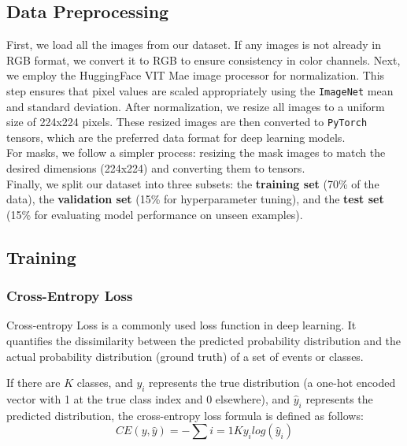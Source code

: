 \subsection{Data Preprocessing}
First, we load all the images from our dataset. If any images is not already in RGB format, we convert it to RGB to ensure consistency in color channels. Next, we employ the HuggingFace VIT Mae image processor %
for normalization. This step ensures that pixel values are scaled appropriately using the \texttt{ImageNet} mean and standard deviation. After normalization, we resize all images to a uniform size of 224x224 pixels. These resized images are then converted to \texttt{PyTorch} tensors, which are the preferred data format for deep learning models. \\For masks, we follow a simpler process: resizing the mask images to match the desired dimensions (224x224) and converting them to tensors.\\Finally, we split our dataset into three subsets: the \textbf{training set} (70\% of the data), the \textbf{validation set} (15\% for hyperparameter tuning), and the \textbf{test set} (15\% for evaluating model performance on unseen examples).

\newpage

\subsection{Training}

\subsubsection{Cross-Entropy Loss}
Cross-entropy Loss is a commonly used loss function in deep learning. It quantifies the dissimilarity between the predicted probability distribution and the actual probability distribution (ground truth) of a set of events or classes.

If there are $K$ classes, and $y_i$ represents the true distribution (a one-hot encoded vector with 1 at the true class index and 0 elsewhere), and $\hat{y}_i$ represents the predicted distribution, the cross-entropy loss formula is defined as follows:
$$CE(y, \hat{y}) = - \sum{i=1}{K}{y_i log(\hat{y}_i)}$$

